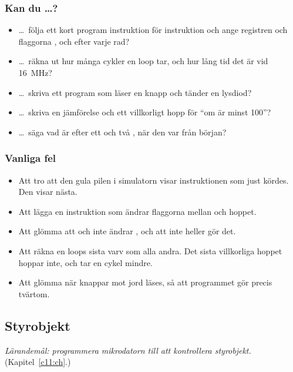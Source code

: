 \subsubsection{Kan du \dots?}
\begin{itemize}
  \item \dots\ följa ett kort program instruktion för instruktion och ange registren och flaggorna
    ,  och  efter varje rad?
  \item \dots\ räkna ut hur många cykler en loop tar, och hur lång tid det är vid 16~MHz?
  \item \dots\ skriva ett program som läser en knapp och tänder en lysdiod?
  \item \dots\ skriva en jämförelse och ett villkorligt hopp för \enquote{om  är minst
    100}?
  \item \dots\ säga vad  är efter ett  och två , när den var
     från början?
\end{itemize}

\subsubsection{Vanliga fel}
\begin{itemize}
  \item Att tro att den gula pilen i simulatorn visar instruktionen som just kördes. Den visar
    nästa.
  \item Att lägga en instruktion som ändrar flaggorna mellan  och hoppet.
  \item Att glömma att  och  inte ändrar , och att  inte
    heller gör det.
  \item Att räkna en loops sista varv som alla andra. Det sista villkorliga hoppet hoppar inte, och
    tar en cykel mindre.
  \item Att glömma  när knappar mot jord läses, så att programmet gör precis tvärtom.
\end{itemize}

\subsection{Styrobjekt}
\label{c12:a7}
\emph{Lärandemål: programmera mikrodatorn till att kontrollera styrobjekt.} (Kapitel~\ref{c11:ch}.)

